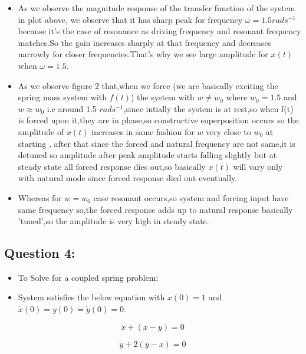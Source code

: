 \documentclass[10pt,a4paper]{article}
\providecommand{\tightlist}{%
      \setlength{\itemsep}{0pt}\setlength{\parskip}{0pt}}
\begin{document}
\begin{itemize}
\tightlist
\item
As we observe the magnitude response of the transfer function of the system in plot above, we observe that it has sharp peak for frequency $\omega = 1.5 rads^{-1}$ because it's the case of resonance as driving frequency and resonant frequency matches.So the gain increases sharply at that frequency and decreases narrowly for closer frequencies.That's why we see large amplitude for $x(t)$ when $\omega = 1.5$.
\item
  As we observe figure 2 that,when we force (we are basically exciting
  the spring mass system with \(f(t)\)) the system with \(w \neq w_0\)
  where \(w_0 = 1.5\) and \(w \approx w_0\) i.e around 1.5
  \(rads^{-1}\),since intially the system is at rest,so when f(t) is
  forced upon it,they are in phase,so constructive superposition occurs
  so the amplitude of \(x(t)\) increases in same fashion for \(w\) very
  close to \(w_0\) at starting , after that since the forced and natural
  frequency are not same,it is detuned so amplitude after peak amplitude
  starts falling slightly but at steady state all forced response dies
  out,so basically \(x(t)\) will vary only with natural mode since
  forced response died out eventually.
\item
  Whereas for \(w=w_0\) case resonant occurs,so system and forcing input
  have same frequency so,the forced response adds up to natural response
  basically 'tuned',so the amplitude is very high in steady state.
\end{itemize}

    \subsection{Question 4:}\label{question-4}

\begin{itemize}
\item
  To Solve for a coupled spring problem:
\item
  System satisfies the below equation with \(x(0) = 1\) and
  \(\dot x(0) = y(0) = \dot y(0) = 0\).
\end{itemize}

\begin{equation}
\ddot x + (x-y) = 0
\end{equation}

\begin{equation}
\ddot y + 2(y-x)= 0
\end{equation}
\end{document}
